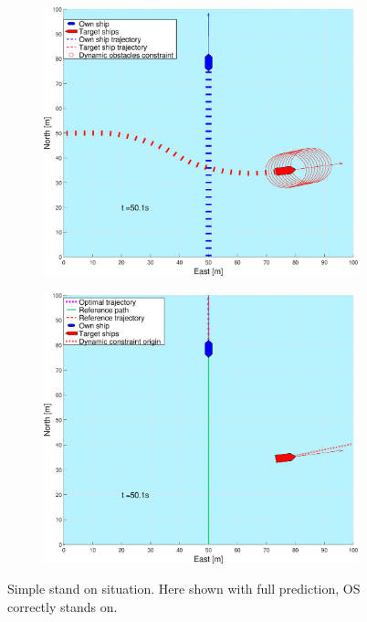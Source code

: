 \begin{figure}[ht!]
\begin{subfigure}[b]{0.499\textwidth}
        \subcaption{}
    \end{subfigure}
    \hfill
    \\
    \begin{subfigure}[b]{0.49\textwidth}
        \centering
        \includegraphics[width=\textwidth]{Images/Figures/enkel_SO/_Simple_0fig1_time=50}
        \subcaption{}
    \end{subfigure}
    \hfill
    \begin{subfigure}[b]{0.499\textwidth}
        \centering
        \includegraphics[width=\textwidth]{Images/Figures/enkel_SO/_Simple_0fig999_time=50}
        \subcaption{}
    \end{subfigure}
    \hfill
    \caption{Simple stand on situation. Here shown with full prediction, \gls{OS} correctly stands on.}
    \label{FIG: simple SO full pred}
\end{figure}%
